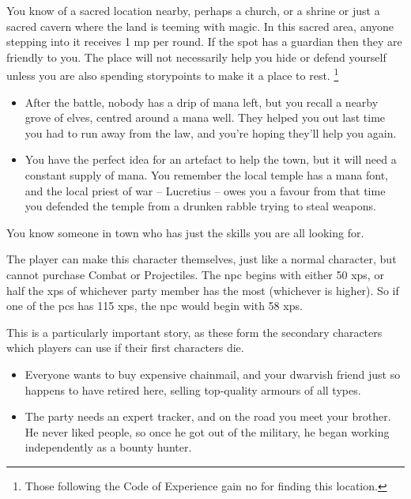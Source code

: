 \begin{multicols}{2}
You know of a sacred location nearby, perhaps a church, or a shrine or just a sacred cavern where the land is teeming with magic.
In this sacred area, anyone stepping into it receives 1 \gls{mp} per \gls{round}.
If the spot has a guardian then they are friendly to you.
The place will not necessarily help you hide or defend yourself unless you are also spending \glspl{storypoint} to make it a place to rest.
\footnote{Those following the Code of Experience gain no  for finding this location.}

\begin{itemize}
\item After the battle, nobody has a drip of mana left, but you recall a nearby grove of elves, centred around a mana well.
They helped you out last time you had to run away from the law, and you're hoping they'll help you again.
\item You have the perfect idea for an artefact to help the town, but it will need a constant supply of mana.
You remember the local temple has a mana font, and the local priest of war -- Lucretius -- owes you a favour from that time you defended the temple from a drunken rabble trying to steal weapons.
\end{itemize}

\label{oldFriend}
You know someone in town who has just the skills you are all looking for.

The player can make this character themselves, just like a normal character, but cannot purchase Combat or Projectiles.
The \gls{npc} begins with either 50 \glspl{xp}, or half the \glspl{xp} of whichever party member has the most (whichever is higher).
So if one of the \glspl{pc} has 115 \glspl{xp}, the \gls{npc} would begin with 58 \glspl{xp}.

This is a particularly important story, as these form the secondary characters which players can use if their first characters die.

\begin{itemize}
\item Everyone wants to buy expensive chainmail, and your dwarvish friend just so happens to have retired here, selling top-quality armours of all types.
\item The party needs an expert tracker, and on the road you meet your brother.
He never liked people, so once he got out of the military, he began working independently as a bounty hunter.
\end{itemize}


\end{multicols}
